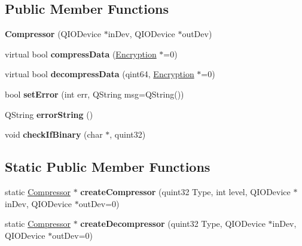 \subsection*{Public Member Functions}
\begin{DoxyCompactItemize}
\item 
{\bfseries Compressor} (Q\+I\+O\+Device $\ast$in\+Dev, Q\+I\+O\+Device $\ast$out\+Dev)\hypertarget{class_compressor_a5623f19c6f1a57729c54c5b86daa3d17}{}\label{class_compressor_a5623f19c6f1a57729c54c5b86daa3d17}

\item 
virtual bool {\bfseries compress\+Data} (\hyperlink{class_encryption}{Encryption} $\ast$=0)\hypertarget{class_compressor_a3662f3d224c11802119599cbfa3d4968}{}\label{class_compressor_a3662f3d224c11802119599cbfa3d4968}

\item 
virtual bool {\bfseries decompress\+Data} (qint64, \hyperlink{class_encryption}{Encryption} $\ast$=0)\hypertarget{class_compressor_abfadce38ef8d0a80c665ddc730060624}{}\label{class_compressor_abfadce38ef8d0a80c665ddc730060624}

\item 
bool {\bfseries set\+Error} (int err, Q\+String msg=Q\+String())\hypertarget{class_compressor_a4de3d2ddd3bc7b9a1b8420ace67f7e7e}{}\label{class_compressor_a4de3d2ddd3bc7b9a1b8420ace67f7e7e}

\item 
Q\+String {\bfseries error\+String} ()\hypertarget{class_compressor_af0eb46f4ff176acee451022f04550bbc}{}\label{class_compressor_af0eb46f4ff176acee451022f04550bbc}

\item 
void {\bfseries check\+If\+Binary} (char $\ast$, quint32)\hypertarget{class_compressor_a8461c15528230cf5429bbe1bc6beb6d3}{}\label{class_compressor_a8461c15528230cf5429bbe1bc6beb6d3}

\end{DoxyCompactItemize}
\subsection*{Static Public Member Functions}
\begin{DoxyCompactItemize}
\item 
static \hyperlink{class_compressor}{Compressor} $\ast$ {\bfseries create\+Compressor} (quint32 Type, int level, Q\+I\+O\+Device $\ast$in\+Dev, Q\+I\+O\+Device $\ast$out\+Dev=0)\hypertarget{class_compressor_a4e31c3a071af09f1a8f0aac6fb5a0ed0}{}\label{class_compressor_a4e31c3a071af09f1a8f0aac6fb5a0ed0}

\item 
static \hyperlink{class_compressor}{Compressor} $\ast$ {\bfseries create\+Decompressor} (quint32 Type, Q\+I\+O\+Device $\ast$in\+Dev, Q\+I\+O\+Device $\ast$out\+Dev=0)\hypertarget{class_compressor_ac43a8e9e39c62073845aec10e3377ae7}{}\label{class_compressor_ac43a8e9e39c62073845aec10e3377ae7}

\end{DoxyCompactItemize}
